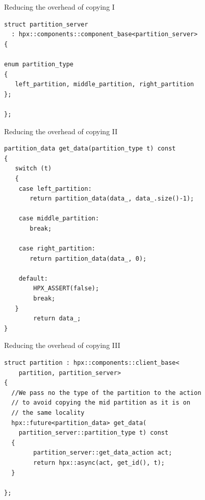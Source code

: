 \documentclass[\classoption]{beamer}
\begin{document}
\begin{frame}[fragile]{Reducing the overhead of copying I}

\begin{center}
\end{center}


\begin{lstlisting}
struct partition_server
  : hpx::components::component_base<partition_server>
{

enum partition_type
{
   left_partition, middle_partition, right_partition
};

};
\end{lstlisting}

\end{frame}

\begin{frame}[fragile]{Reducing the overhead of copying II}

\begin{lstlisting}
partition_data get_data(partition_type t) const
{
   switch (t)
   {
    case left_partition:
       return partition_data(data_, data_.size()-1);

    case middle_partition:
       break;

    case right_partition:
       return partition_data(data_, 0);

    default:
        HPX_ASSERT(false);
        break;
   }
        return data_;
}
\end{lstlisting}

\end{frame}

\begin{frame}[fragile]{Reducing the overhead of copying III}

\begin{lstlisting}
struct partition : hpx::components::client_base<
	partition, partition_server>
{
  //We pass no the type of the partition to the action
  // to avoid copying the mid partition as it is on 
  // the same locality 
  hpx::future<partition_data> get_data(
  	partition_server::partition_type t) const
  {
        partition_server::get_data_action act;
        return hpx::async(act, get_id(), t);
  }

};
\end{lstlisting}

\end{frame}
\end{document}
